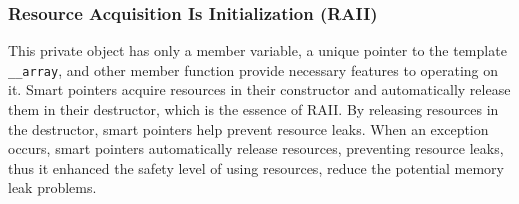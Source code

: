 \subsubsection{Resource Acquisition Is Initialization (RAII)}\label{SEC:RAII}
This private object has only a member variable, a unique pointer to the template \texttt{\_\_array}, 
and other member function provide necessary features to operating on it.
Smart pointers acquire resources in their constructor and automatically release them in their destructor, 
which is the essence of RAII. 
By releasing resources in the destructor, smart pointers help prevent resource leaks.
When an exception occurs, smart pointers automatically release resources, preventing resource leaks,
thus it enhanced the safety level of using resources, reduce the potential memory leak problems.


